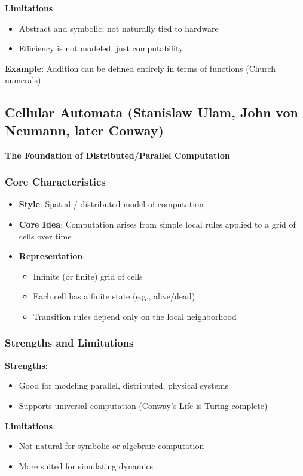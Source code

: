 \textbf{Limitations}:
\begin{itemize}
    \item Abstract and symbolic; not naturally tied to hardware
    \item Efficiency is not modeled, just computability
\end{itemize}

\textbf{Example}: Addition can be defined entirely in terms of functions (Church numerals).

\subsection{Cellular Automata (Stanislaw Ulam, John von Neumann, later Conway)}
\textbf{The Foundation of Distributed/Parallel Computation}

\subsubsection{Core Characteristics}
\begin{itemize}
    \item \textbf{Style}: Spatial / distributed model of computation
    \item \textbf{Core Idea}: Computation arises from simple local rules applied to a grid of cells over time
    \item \textbf{Representation}:
    \begin{itemize}
        \item Infinite (or finite) grid of cells
        \item Each cell has a finite state (e.g., alive/dead)
        \item Transition rules depend only on the local neighborhood
    \end{itemize}
\end{itemize}

\subsubsection{Strengths and Limitations}
\textbf{Strengths}:
\begin{itemize}
    \item Good for modeling parallel, distributed, physical systems
    \item Supports universal computation (Conway's Life is Turing-complete)
\end{itemize}

\textbf{Limitations}:
\begin{itemize}
    \item Not natural for symbolic or algebraic computation
    \item More suited for simulating dynamics
\end{itemize}

